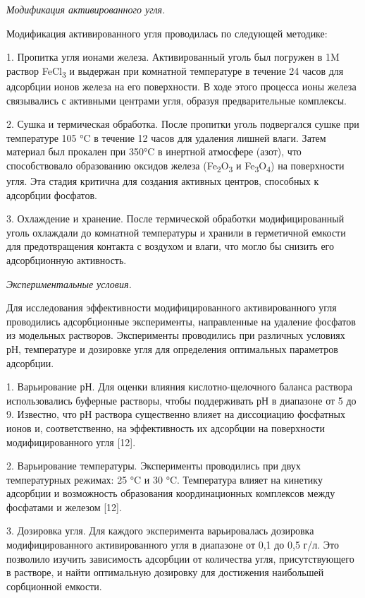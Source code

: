 \begin{multicols}{2}
\emph{Модификация активированного угля.}

Модификация активированного угля проводилась по следующей методике:

1. Пропитка угля ионами железа. Активированный уголь был погружен в 1M
раствор FeCl\textsubscript{3} и выдержан при комнатной температуре в
течение 24 часов для адсорбции ионов железа на его поверхности. В ходе
этого процесса ионы железа связывались с активными центрами угля,
образуя предварительные комплексы.

2. Сушка и термическая обработка. После пропитки уголь подвергался сушке
при температуре 105 °C в течение 12 часов для удаления лишней влаги.
Затем материал был прокален при 350°C в инертной атмосфере (азот), что
способствовало образованию оксидов железа
(Fe\textsubscript{2}O\textsubscript{3} и
Fe\textsubscript{3}O\textsubscript{4}) на поверхности угля. Эта стадия
критична для создания активных центров, способных к адсорбции фосфатов.

3. Охлаждение и хранение. После термической обработки модифицированный
уголь охлаждали до комнатной температуры и хранили в герметичной емкости
для предотвращения контакта с воздухом и влаги, что могло бы снизить его
адсорбционную активность.

\emph{Экспериментальные условия.}

Для исследования эффективности модифицированного активированного угля
проводились адсорбционные эксперименты, направленные на удаление
фосфатов из модельных растворов. Эксперименты проводились при различных
условиях рН, температуре и дозировке угля для определения оптимальных
параметров адсорбции.

1. Варьирование рН. Для оценки влияния кислотно-щелочного баланса
раствора использовались буферные растворы, чтобы поддерживать рН в
диапазоне от 5 до 9. Известно, что рН раствора существенно влияет на
диссоциацию фосфатных ионов и, соответственно, на эффективность их
адсорбции на поверхности модифицированного угля {[}12{]}.

2. Варьирование температуры. Эксперименты проводились при двух
температурных режимах: 25 °C и 30 °C. Температура влияет на кинетику
адсорбции и возможность образования координационных комплексов между
фосфатами и железом {[}12{]}.

3. Дозировка угля. Для каждого эксперимента варьировалась дозировка
модифицированного активированного угля в диапазоне от 0,1 до 0,5 г/л.
Это позволило изучить зависимость адсорбции от количества угля,
присутствующего в растворе, и найти оптимальную дозировку для достижения
наибольшей сорбционной емкости.
\end{multicols}

